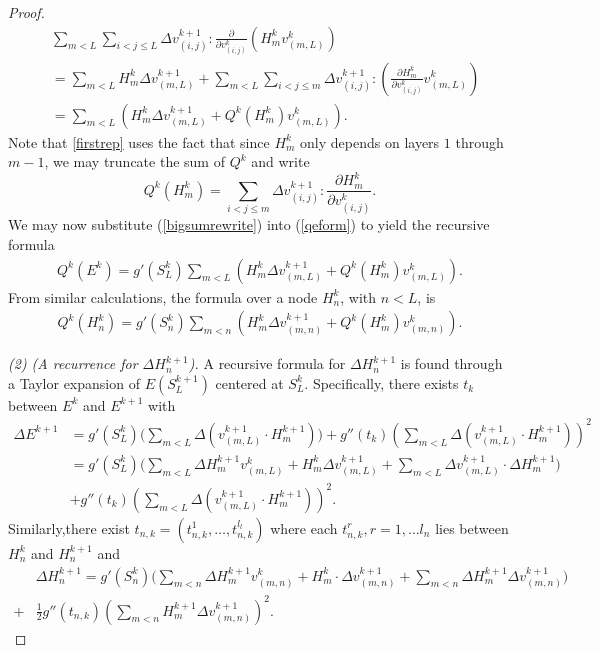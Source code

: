 \documentclass{jcmlatex}
\begin{document}
\begin{proof}
  \begin{align}
 &\sum_{m<L}\sum_{i<j\le L} \Delta v_{(i,j)}^{k+1}:
\frac{\partial }{\partial v_{(i,j)}^k}\left( H_m^{k}v_{(m,L)}^k \right) \label{bigsumrewrite}\\
&= \sum_{m<L}H_m^k\Delta v_{(m,L)}^{k+1} 
+\sum_{m<L}\sum_{i<j\le m}\Delta v_{(i,j)}^{k+1}:\left(\frac{\partial H_m^k}{\partial
v_{(i,j)}^k}v_{(m,L)}^k  
 \right) \label{firstrep}\\
 &= \sum_{m<L}\left(H_m^k\Delta v_{(m,L)}^{k+1} +Q^k(H^k_m)v^k_{(m,L)}  
\right).
\end{align}
Note that \ref{firstrep} uses the fact that since $H_m^k$ only depends on layers $1$ through $m-1$, we may truncate the sum of $Q^k$ and write\begin{equation}
Q^k(H_m^k) =\sum_{i<j\le m}  \Delta v_{(i,j)}^{k+1}:\frac{\partial H_m^k
}{\partial v_{(i,j)}^k}.
\end{equation}
We may now substitute (\ref{bigsumrewrite}) into (\ref{qeform}) to yield the recursive formula
\begin{align}
Q^k(E^k)=  g'\left(S_L^k \right)\sum_{m<L}\left( H_m^k\Delta v_{(m,L)}^{k+1}+Q^k(H^k_m)v^k_{(m,L)}
  \right).
\end{align}
From similar calculations, the formula over a node $H^k_n$, with $n<L$, is
\begin{align}
Q^k(H^k_n)= g'\left(S_n^k\right)\sum_{m<n}\left( H_m^k\Delta v_{(m,n)}^{k+1}+Q^k(H^k_m)v^k_{(m,n)}
  \right).\label{qrec}
\end{align}

\textit{(2) (A recurrence for $\Delta H_n^{k+1}$).} A recursive formula for   $\Delta H^{k+1}_n$ is found through a Taylor expansion of $E(S_L^{k+1})$ centered at $S_L^k$. Specifically, there exists $t_{k}$ between $E^{k}$
and $E^{k+1}$ with
\begin{align}
\Delta E^{k+1} &=  g'\left(S_L^{k} \right)\Big(\sum_{m < L} \Delta( v_{(m,L)}^{k+1}\cdot H_m^{k+1}) \Big)+g''(t_{k})\left(\sum_{m < L}\Delta( v_{(m,L)}^{k+1}\cdot H_m^{k+1})\right)^2\\
 &=  g'\left(S_L^{k} \right)\Big(\sum_{m < L} \Delta H_m^{k+1}
v_{(m,L)}^k +H^k_m\Delta v_{(m,L)}^{k+1}
+\sum_{m < L}\Delta v_{(m,L)}^{k+1}\cdot \Delta H_m^{k+1} \Big)
\\&+g''(t_{k})\left(\sum_{m < L}\Delta( v_{(m,L)}^{k+1}\cdot H_m^{k+1})\right)^2.
\end{align} 
Similarly,there exist $t_{n,k} = (t_{n,k}^{1}, \dots, t_{n,k}^{l_l})$ where each
$t_{n,k}^r, r = 1, \dots l_n$ lies between $H_n^k$ and $H_n^{k+1}$ and
\begin{align}
&\Delta H_n^{k+1} = g'\left(S_n^k \right)\Big(\sum_{m < n}\Delta H_m^{k+1}v_{(m,n)}^k
 +H^k_m\cdot\Delta v_{(m,n)}^{k+1}
+\sum_{m < n}\Delta H_m^{k+1}\Delta v_{(m,n)}^{k+1}  \Big)
\\+&\frac 12g''(t_{n,k})\left(\sum_{m < n}H_m^{k+1}\Delta v_{(m,n)}^{k+1}
\right)^2\label{diffrec}. 
\end{align}



\end{proof}
\end{document}
